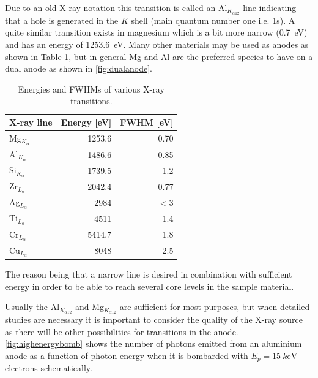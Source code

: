 Due to an old X-ray notation this transition is called an Al$_{K_{\alpha 12}}$ line indicating that a hole is generated in the $K$ shell (main quantum number one i.e. 1s). A quite similar transition exists in magnesium which is a bit more narrow (\SI{0.7}{\electronvolt}) and has an energy of \SI{1253.6}{\electronvolt}. Many other materials may be used as anodes as shown in Table \ref{tab:transenergies}, but in general Mg and Al are the preferred species to have on a dual anode as shown in \autoref{fig:dualanode}.

\begin{table}
\begin{center}
\caption{Energies and FWHMs of various X-ray transitions.}\label{tab:transenergies}
\begin{tabular}{|l|r|r|} \hline
X-ray line & Energy [\si{\electronvolt}] & FWHM [\si{\electronvolt}] \\ \hline
Mg$_{K_{\alpha}}$ & 1253.6 & 0.70 \\ \hline
Al$_{K_{\alpha}}$ & 1486.6 & 0.85 \\ \hline
Si$_{K_{\alpha}}$ & 1739.5 & 1.2 \\ \hline
Zr$_{L_{\alpha}}$ & 2042.4 & 0.77 \\ \hline
Ag$_{L_{\alpha}}$ & 2984 & $<3$ \\ \hline
Ti$_{L_{\alpha}}$ & 4511 & 1.4 \\ \hline
Cr$_{L_{\alpha}}$ & 5414.7 & 1.8 \\ \hline
Cu$_{L_{\alpha}}$ & 8048 & 2.5 \\ \hline
\end{tabular}
\end{center}
\end{table}

The reason being that a narrow line is desired in combination with sufficient energy in order to be able to reach several core levels in the sample material.

Usually the Al$_{K_{\alpha 12}}$ and Mg$_{K_{\alpha 12}}$ are sufficient for most purposes, but when detailed studies are necessary it is important to consider the quality of the X-ray source as there will be other possibilities for transitions in the anode. \autoref{fig:highenergybomb} shows the number of photons emitted from an aluminium anode as a function of photon energy when it is bombarded with $E_p=\SI{15}{k\electronvolt}$ electrons schematically.

